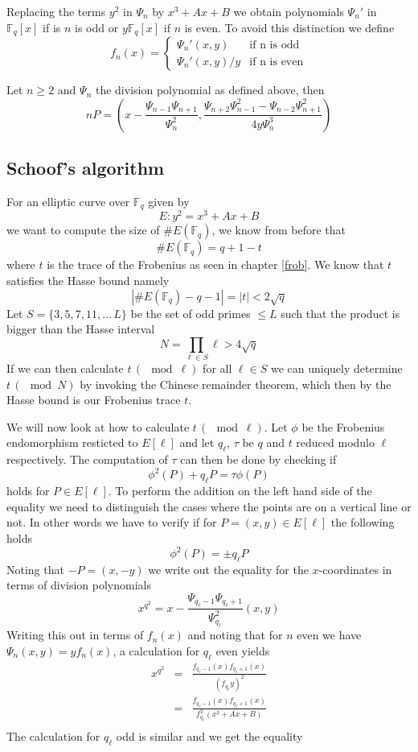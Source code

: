 Replacing the terms $y^2$ in $\Psi_n$ by $x^3 + Ax + B$ we obtain polynomials $\Psi_n '$ in
$\mathbb{F}_q[x]$ if is $n$ is odd or $y \mathbb{F}_q[x]$ if $n$ is even. To avoid
this distinction we define
$$
f_n(x) = \begin{cases}
          \Psi_n '(x,y) & \text{if n is odd} \\
	  \Psi_n '(x,y)/y & \text{if n is even}
         \end{cases}
$$


\begin{prop}
 Let $n \geq 2$ and $\Psi_n$ the division polynomial as defined above, then
$$ nP = (x - \frac{\Psi_{n-1} \Psi_{n+1}}{\Psi_n^2}, \frac{\Psi_{n+2} \Psi_{n-1}^2 - \Psi_{n-2} \Psi_{n+1}^2}{4y \Psi_n^3} )$$
\end{prop}

\subsection{Schoof's algorithm}
For an elliptic curve over $\mathbb{F}_q$ given by
$$ E: y^2 = x^3 + Ax + B $$
we want to compute the size of $\#E(\mathbb{F}_q)$, we know from before that
$$ \#E(\mathbb{F}_q) = q + 1 - t $$
where $t$ is the trace of the Frobenius as seen in chapter \ref{frob}. We know
that $t$ satisfies the Hasse bound namely
$$ |\#E(\mathbb{F}_q)-q-1|=|t| < 2\sqrt{q} $$
Let $S = \{3, 5, 7, 11, \ldots \, L \}$ be the set of odd primes $\leq L$ such
that the product is bigger than the Hasse interval
$$ N = \prod_{\ell \in S} \ell  > 4\sqrt{q} $$
If we can then calculate $t\, (\mod \ell)$ for all $\ell \in S$ we can uniquely
determine $t\,(\mod N)$ by invoking the Chinese remainder theorem,
which then by the Hasse bound is our Frobenius trace $t$.

We will now look at
how to calculate $t\, (\mod \ell)$. Let $\phi$ be the Frobenius endomorphism
resticted to $E[\ell]$ and let $q_\ell$, $\tau$ be $q$ and $t$ reduced modulo $\ell$
respectively. The computation of $\tau$ can then be done by checking if
$$ \phi^2(P) + q_\ell P = \tau \phi(P) $$
holds for $P \in E[\ell]$. To perform the addition on the left hand side of the
equality we need to distinguish the cases where the points are on a vertical line or not.
In other words we have to verify if for $P = (x,y) \in E[\ell]$ the following holds
$$ \phi^2 (P) = \pm q_\ell P $$
Noting that $-P = (x, -y)$ we write out the equality for the $x$-coordinates in terms of
division polynomials
$$ x^{q^2} = x - \frac{\Psi_{q_\ell-1} \Psi_{q_\ell+1}}{\Psi_{q_\ell}^2}(x,y) $$
Writing this out in terms of $f_n(x)$ and noting that for $n$ even we have
$\Psi_n(x,y) = y f_n(x)$, a calculation for $q_\ell$ even yields
\begin{eqnarray*}
 x^{q^2} &=& \frac{f_{q_\ell-1}(x) f_{q_\ell+1}(x)}{(f_{q_\ell} y)^2} \nonumber \\
	 &=& \frac{f_{q_\ell-1}(x) f_{q_\ell+1}(x)}{f_{q_\ell}^2 (x^3+Ax+B)} \nonumber \\
\end{eqnarray*}
The calculation for $q_\ell$ odd is similar and we get the equality

